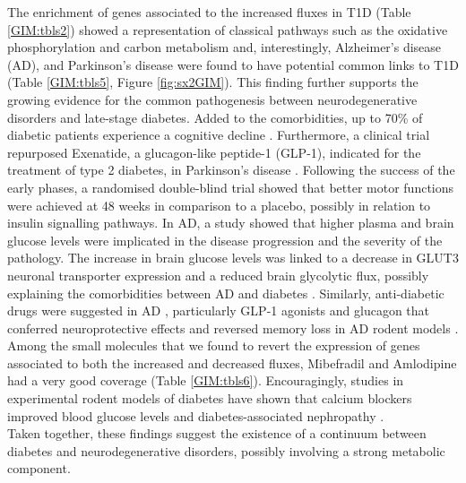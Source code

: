 The enrichment of genes associated to the increased fluxes in T1D (Table \ref{GIM:tbls2}) showed a representation of classical pathways such as the oxidative phosphorylation and carbon metabolism and, interestingly, Alzheimer's disease (AD), and Parkinson's disease were found to have potential common links to T1D (Table \ref{GIM:tbls5}, Figure \ref{fig:sx2GIM}). This finding further supports the growing evidence \cite{lalic2008glucose,moran2015type} for the common pathogenesis between neurodegenerative disorders and late-stage diabetes. Added to the comorbidities, up to 70\% of diabetic patients experience a cognitive decline \cite{cukierman2005cognitive}. Furthermore, a clinical trial repurposed Exenatide, a glucagon-like peptide-1 (GLP-1), indicated for the treatment of type 2 diabetes, in Parkinson's disease \cite{aviles2013exenatide,aviles2014motor}. Following the success of the early phases, a randomised double-blind trial \cite{athauda2017exenatide} showed that better motor functions were achieved at 48 weeks in comparison to a placebo, possibly in relation to insulin signalling pathways. In AD, a study showed that higher plasma and brain glucose levels were implicated in the disease progression \cite{an2017evidence} and the severity of the pathology. The increase in brain glucose levels was linked to a decrease in GLUT3 neuronal transporter expression and a reduced brain glycolytic flux, possibly explaining the comorbidities between AD and diabetes \cite{sims2010does,janson2004increased}.  Similarly, anti-diabetic drugs were suggested in AD \cite{guney2016network,yarchoan2014repurposing}, particularly GLP-1 agonists and glucagon that conferred neuroprotective effects and reversed memory loss in AD rodent models \cite{tai2018neuroprotective}. Among the small molecules that we found to revert the expression of genes associated to both the increased and decreased fluxes, Mibefradil and Amlodipine had a very good coverage (Table \ref{GIM:tbls6}). Encouragingly, studies in experimental rodent models of diabetes have shown that calcium blockers improved blood glucose levels and diabetes-associated nephropathy \cite{ma2004calcium, lu2014mibefradil}.\\
Taken together, these findings suggest the existence of a continuum between diabetes and neurodegenerative disorders, possibly involving a strong metabolic component.
